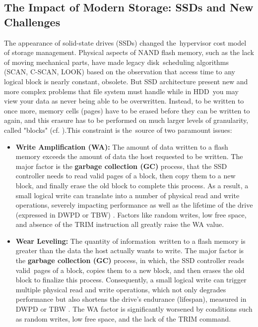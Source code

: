 \documentclass[12pt]{article}
\begin{document}
\subsection{The Impact of Modern Storage: SSDs and New Challenges}
The appearance of solid-state drives (SSDs) changed the hypervisor cost model of storage management. Physical aspects of NAND flash memory, such as the lack of moving mechanical parts, have made legacy disk scheduling algorithms (SCAN, C-SCAN, LOOK) based on the observation that access time to any logical block is nearly constant, obsolete.
But SSD architecture present new and more complex problems that file system must handle while in HDD you may view your data as never being able to be overwritten. Instead, to be written to once more, memory cells (pages) have to be erased before they can be written to again, and this erasure has to be performed on much larger levels of granularity, called "blocks" (cf. \parencite{Viking2017AN0035, Lu2013Extending}).This constraint is the source of two paramount issues:

\begin{itemize}
    \item \textbf{Write Amplification (WA):} The amount of data written to a flash memory exceeds the amount of data the host requested to be written. The major factor is the \textbf{garbage collection (GC)} process, that the SSD controller needs to read valid pages of a block, then copy them to a new block, and finally erase the old block to complete this process. As a result, a small logical write can translate into a number of physical read and write operations, severely impacting performance as well as the lifetime of the drive (expressed in DWPD or TBW) \parencite{Viking2017AN0035}. Factors like random writes, low free space, and absence of the TRIM instruction all greatly raise the WA value.
    \item \textbf{Wear Leveling:} The quantity of information written to a flash memory is greater than the data the host actually wants to write. The major factor is the \textbf{garbage collection (GC)} process, in which, the SSD controller reads valid pages of a block, copies them to a new block, and then erases the old block to finalize this process. Consequently, a small logical write can trigger multiple physical read and write operations, which not only degrades performance but also shortens the drive's endurance (lifespan), measured in DWPD or TBW \parencite{Viking2017AN0035}. The WA factor is significantly worsened by conditions such as random writes, low free space, and the lack of the TRIM command.
\end{itemize} 
\end{document}
